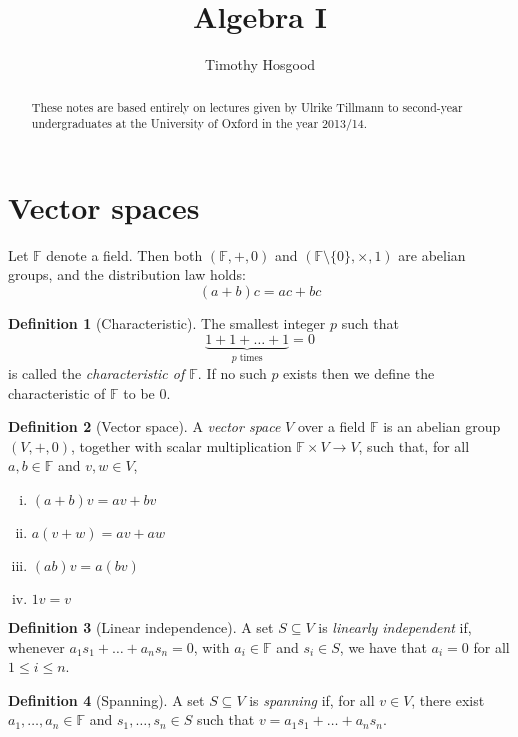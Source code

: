 \documentclass[10pt,fleqn]{article}
\author{Timothy Hosgood}
\title{Algebra I}
\newcommand{\field}{\mathbb{F}}
\theoremstyle{definition} \newtheorem{defn}{Definition}[section]
\theoremstyle{plain}      \newtheorem{thm}[defn]{Theorem}
\theoremstyle{plain}      \newtheorem{prop}[defn]{Proposition}
\theoremstyle{plain}      \newtheorem{lem}[defn]{Lemma}
\theoremstyle{plain}      \newtheorem{cor}[defn]{Corollary}
\theoremstyle{plain}      \newtheorem{ad}[defn]{Addendum}
\theoremstyle{definition} \newtheorem{ex}[defn]{Example}
\theoremstyle{definition} \newtheorem{rem}[defn]{Remark}
\numberwithin{equation}{subsection}
\begin{document}
\maketitle
\begin{abstract}
    These notes are based entirely on lectures given by Ulrike Tillmann to second-year undergraduates at the University of Oxford in the year 2013/14.
\end{abstract}
\tableofcontents

\section{Vector spaces}

Let $\field$ denote a field.
Then both $(\field,+,0)$ and $(\field\setminus\{0\},\times,1)$ are abelian groups, and the distribution law holds:
\[
    (a+b)c=
    ac+bc
\]

\begin{defn}[Characteristic]
    The smallest integer $p$ such that
    \[
        \underbrace{1+1+\ldots+1}_{p\text{ times}}=
        0
    \]
    is called the \emph{characteristic of $\field$}.
    If no such $p$ exists then we define the characteristic of $\field$ to be 0.
\end{defn}

\begin{defn}[Vector space]
    A \emph{vector space} $V$ over a field $\field$ is an abelian group $(V,+,0)$, together with scalar multiplication $\field\times V\to V$, such that, for all $a,b\in\field$ and $v,w\in V$,
    \begin{enumerate}[(i)]
        \item $(a+b)v=av+bv$
        \item $a(v+w)=av+aw$
        \item $(ab)v=a(bv)$
        \item $1v=v$
    \end{enumerate}
\end{defn}

\begin{defn}[Linear independence]
    A set $S\subseteq V$ is \emph{linearly independent} if, whenever $a_1s_1+\ldots+a_ns_n=0$, with $a_i\in\field$ and $s_i\in S$, we have that $a_i=0$ for all $1\leq i\leq n$.
\end{defn}

\begin{defn}[Spanning]
    A set $S\subseteq V$ is \emph{spanning} if, for all $v\in V$, there exist $a_1,\ldots,a_n\in\field$ and $s_1,\ldots,s_n\in S$ such that $v=a_1s_1+\ldots+a_ns_n$.
\end{defn}
\end{document}
